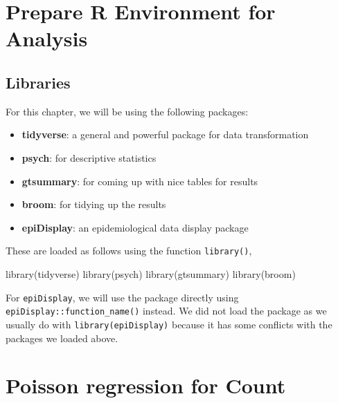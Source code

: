 \documentclass[
  10pt,
]{krantz}
\newenvironment{Shaded}{\begin{snugshade}}{\end{snugshade}}
\newcommand{\FunctionTok}[1]{\textcolor[rgb]{0.00,0.00,0.00}{#1}}
\newcommand{\NormalTok}[1]{#1}
\providecommand{\tightlist}{%
  \setlength{\itemsep}{0pt}\setlength{\parskip}{0pt}}
\begin{document}
\hypertarget{prepare-r-environment-for-analysis-1}{%
\section{Prepare R Environment for Analysis}\label{prepare-r-environment-for-analysis-1}}

\hypertarget{libraries-1}{%
\subsection{Libraries}\label{libraries-1}}

For this chapter, we will be using the following packages:

\begin{itemize}
\tightlist
\item
  \textbf{tidyverse}: a general and powerful package for data transformation
\item
  \textbf{psych}: for descriptive statistics
\item
  \textbf{gtsummary}: for coming up with nice tables for results
\item
  \textbf{broom}: for tidying up the results
\item
  \textbf{epiDisplay}: an epidemiological data display package
\end{itemize}

These are loaded as follows using the function \texttt{library()},

\begin{Shaded}
\begin{Highlighting}[]
\FunctionTok{library}\NormalTok{(tidyverse)}
\FunctionTok{library}\NormalTok{(psych)}
\FunctionTok{library}\NormalTok{(gtsummary)}
\FunctionTok{library}\NormalTok{(broom)}
\end{Highlighting}
\end{Shaded}

For \texttt{epiDisplay}, we will use the package directly using \texttt{epiDisplay::function\_name()} instead.
We did not load the package as we usually do with \texttt{library(epiDisplay)} because it has some conflicts with the packages we loaded above.

\hypertarget{poisson-regression-for-count}{%
\section{\texorpdfstring{Poisson regression for Count}{Poisson regression for Count}}\label{poisson-regression-for-count}}
\end{document}
